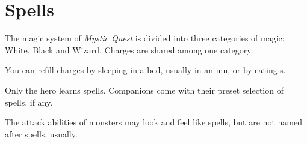 \chapter{Spells}

The magic system of \textit{Mystic Quest} is divided into three categories of magic: White, Black and Wizard. Charges are shared among one category.

You can refill charges by sleeping in a bed, usually in an inn, or by eating s.

Only the hero learns spells. Companions come with their preset selection of spells, if any.

The attack abilities of monsters may look and feel like spells, but are not named after spells, usually.

\newpage

\newpage

\newpage

\newpage

\newpage

\newpage

\newpage

\newpage

\newpage

\newpage

\newpage

\newpage


